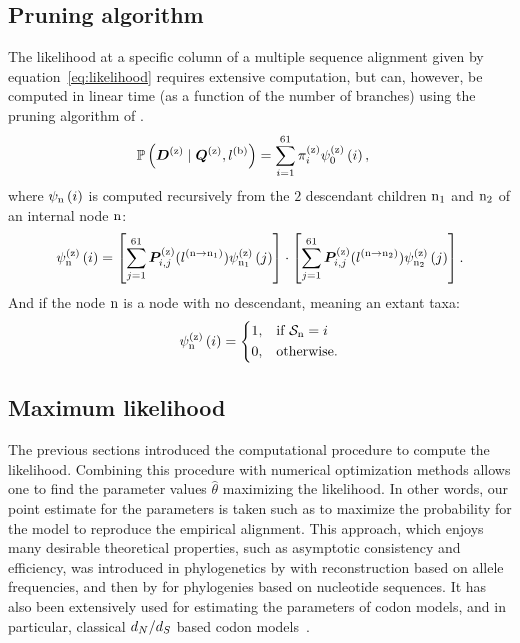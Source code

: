 \subsection{Pruning algorithm}
\label{subsec:pruning-algorithm}
The \gls{likelihood} at a specific column of a multiple sequence alignment given by equation~\ref{eq:likelihood} requires extensive computation, but can, however, be computed in linear time (as a function of the number of branches) using the pruning algorithm of \citet{Felsenstein1981}.
\begin{align}
    \mathbb{P} \left(\bm{D}^{(\text{z})} \mid \bm{Q}^{(\text{z})}, l^{(\text{b})} \right) & = \sum\limits_{{i}=1}^{61} \pi^{(\text{z})}_{{i}} \psi^{(\text{z})}_{0} \left( {i} \right),
\end{align}
where $\psi_{\text{n}} \left( {i} \right)$ is computed recursively from the $2$ descendant children $\text{n}_{1}$ and $\text{n}_{2}$ of an internal node $\text{n}$:
\begin{align}
    \psi^{(\text{z})}_{\text{n}} \left( {i} \right) =
    \left[ \sum\limits_{{j}=1}^{61}\bm{P}^{(\text{z})}_{{i}, {j}}(l^{(\text{n} \to \text{n}_{1})}) \psi^{(\text{z})}_{\text{n}_{1}} \left( {j} \right) \right]
    \cdot
    \left[ \sum\limits_{{j}=1}^{61}\bm{P}^{(\text{z})}_{{i}, {j}}(l^{(\text{n} \to \text{n}_{2})}) \psi^{(\text{z})}_{\text{n}_{2}} \left( {j} \right) \right].
\end{align}
And if the node $\text{n}$ is a node with no descendant, meaning an extant taxa:
\begin{align}
    \psi^{(\text{z})}_{\text{n}} \left( {i} \right) =
    \begin{dcases}
        1, & \text{if } \mathcal{S}_{\text{n}} = {i} \\
        0, & \text{otherwise.}
    \end{dcases}
\end{align}

\subsection{Maximum likelihood}
\label{subsec:maximum-likelihood}

The previous sections introduced the computational procedure to compute the \gls{likelihood}.
Combining this procedure with numerical optimization methods allows one to find the parameter values $\widehat{\theta}$ maximizing the \gls{likelihood}.
In other words, our point estimate for the parameters is taken such as to maximize the probability for the model to reproduce the empirical alignment.
This approach, which enjoys many desirable theoretical properties, such as asymptotic consistency and efficiency, was introduced in phylogenetics by \citet{Cavalli-Sforza1967} with reconstruction based on \gls{allele} frequencies, and then by \citet{Felsenstein1981} for phylogenies based on nucleotide sequences.
It has also been extensively used for estimating the parameters of \gls{codon} models, and in particular, classical $d_N / d_S$ based \gls{codon} models~\citep{Yang1997a,Pond2005,Dutheil2006,Yang2007,Gueguen2013,KosakovskyPond2020}.


